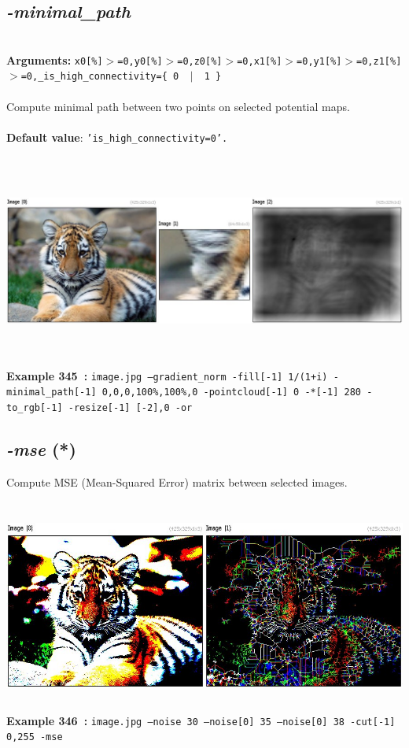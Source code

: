 \documentclass[a4paper,11pt,twoside]{book}
\begin{document}
\subsection{\emph{-minimal\_path} }\vspace*{-0.5em}
~\\\textbf{Arguments: } 
{\small \texttt{x0[\%]$>$=0,y0[\%]$>$=0,z0[\%]$>$=0,x1[\%]$>$=0,y1[\%]$>$=0,z1[\%]$>$=0,\_is\_high\_connectivity=\{ 0 ~$|$~ 1 \}}}\\~\\
Compute minimal path between two points on selected potential maps.
~\\~\\\textbf{Default value}: {\small \texttt{'is\_high\_connectivity=0'.}}
\begin{center}\includegraphics[keepaspectratio=true,height=7cm,width=\textwidth]{img/gmic_def345.jpg}\\
{\footnotesize \textbf{Example 345~:} \texttt{image.jpg --gradient\_norm -fill[-1] 1/(1+i) -minimal\_path[-1] 0,0,0,100\%,100\%,0 -pointcloud[-1] 0 -*[-1] 280 -to\_rgb[-1] -resize[-1] [-2],0 -or}}
\end{center}

\subsection{\emph{-mse} (*)}\vspace*{-0.5em}
Compute MSE (Mean-Squared Error) matrix between selected images.
\begin{center}\includegraphics[keepaspectratio=true,height=7cm,width=\textwidth]{img/gmic_def346.jpg}\\
{\footnotesize \textbf{Example 346~:} \texttt{image.jpg --noise 30 --noise[0] 35 --noise[0] 38 -cut[-1] 0,255 -mse}}
\end{center}
\end{document}
